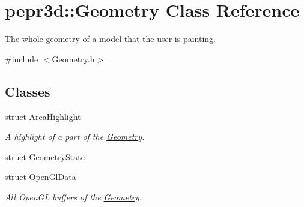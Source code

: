 \hypertarget{classpepr3d_1_1_geometry}{}\section{pepr3d\+::Geometry Class Reference}
\label{classpepr3d_1_1_geometry}


The whole geometry of a model that the user is painting.  




{\ttfamily \#include $<$Geometry.\+h$>$}

\subsection*{Classes}
\begin{DoxyCompactItemize}
\item 
struct \mbox{\hyperlink{structpepr3d_1_1_geometry_1_1_area_highlight}{Area\+Highlight}}
\begin{DoxyCompactList}\small\item\em A highlight of a part of the \mbox{\hyperlink{classpepr3d_1_1_geometry}{Geometry}}. \end{DoxyCompactList}\item 
struct \mbox{\hyperlink{structpepr3d_1_1_geometry_1_1_geometry_state}{Geometry\+State}}
\item 
struct \mbox{\hyperlink{structpepr3d_1_1_geometry_1_1_open_gl_data}{Open\+Gl\+Data}}
\begin{DoxyCompactList}\small\item\em All Open\+GL buffers of the \mbox{\hyperlink{classpepr3d_1_1_geometry}{Geometry}}. \end{DoxyCompactList}\end{DoxyCompactItemize}
